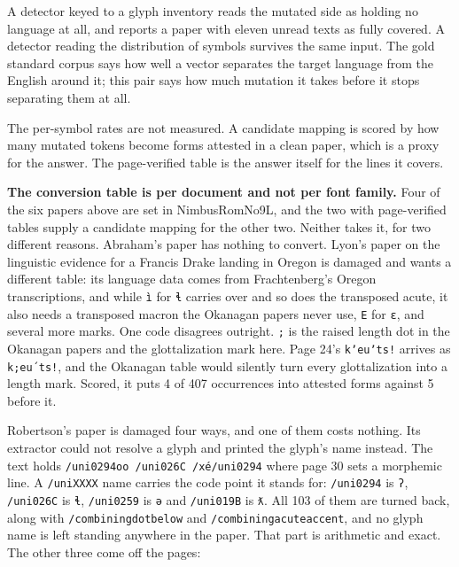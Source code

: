 A detector keyed to a glyph inventory reads the mutated side as holding no language at all, and reports a paper with eleven unread texts as fully covered. A detector reading the distribution of symbols survives the same input. The gold standard corpus says how well a vector separates the target language from the English around it; this pair says how much mutation it takes before it stops separating them at all.

The per-symbol rates are not measured. A candidate mapping is scored by how many mutated tokens become forms attested in a clean paper, which is a proxy for the answer. The page-verified table is the answer itself for the lines it covers.

\textbf{The conversion table is per document and not per font family.} Four of the six papers above are set in NimbusRomNo9L, and the two with page-verified tables supply a candidate mapping for the other two. Neither takes it, for two different reasons. Abraham's paper has nothing to convert. Lyon's paper on the linguistic evidence for a Francis Drake landing in Oregon \cite{src:Lyon-2014} is damaged and wants a different table: its language data comes from Frachtenberg's Oregon transcriptions, and while \texttt{ì} for \texttt{ɬ} carries over and so does the transposed acute, it also needs a transposed macron the Okanagan papers never use, \texttt{E} for \texttt{ɛ}, and several more marks. One code disagrees outright. \texttt{;} is the raised length dot in the Okanagan papers and the glottalization mark here. Page 24's \texttt{kʼeuʼts!} arrives as \texttt{k;eu´ts!}, and the Okanagan table would silently turn every glottalization into a length mark. Scored, it puts 4 of 407 occurrences into attested forms against 5 before it.

Robertson's paper \cite{src:Robertson-2012} is damaged four ways, and one of them costs nothing. Its extractor could not resolve a glyph and printed the glyph's name instead. The text holds \texttt{/uni0294oo /uni026C /xé/uni0294} where page 30 sets a morphemic line. A \texttt{/uniXXXX} name carries the code point it stands for: \texttt{/uni0294} is \texttt{ʔ}, \texttt{/uni026C} is \texttt{ɬ}, \texttt{/uni0259} is \texttt{ə} and \texttt{/uni019B} is \texttt{ƛ}. All 103 of them are turned back, along with \texttt{/combiningdotbelow} and \texttt{/combiningacuteaccent}, and no glyph name is left standing anywhere in the paper. That part is arithmetic and exact. The other three come off the pages:

